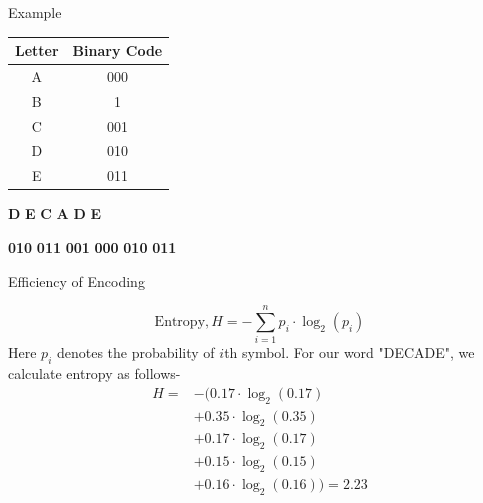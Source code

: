 \documentclass{beamer}
\begin{document}
	\begin{frame}{Example}
		
		\centering
		\begin{table}
			\begin{tabular}{c|c}
				\hline
				\onslide<1-> \textbf{Letter} & \textbf{Binary Code} \\
				\hline
				A & 000  \\
				B & 1  \\
				C & 001 \\
				D & 010 \\
				E & 011 
			\end{tabular}
		\end{table}
		\begin{center}
			\Large
			\textcolor{codecolorone}{\textbf{D}}
			\onslide<2->
			\textcolor{codecolortwo}{\textbf{E}}
			\onslide<3->
			\textcolor{codecolorone}{\textbf{C}}
			\onslide<4->
			\textcolor{codecolortwo}{\textbf{A}}
			\onslide<5->
			\textcolor{codecolorone}{\textbf{D}}
			\onslide<6->
			\textcolor{codecolortwo}{\textbf{E}}
		\end{center}
		
		\begin{center}
			\huge
			\textcolor{codecolorone}{\textbf{010}}
			\onslide<2->
			\textcolor{codecolortwo}{\textbf{011}}
			\onslide<3->
			\textcolor{codecolorone}{\textbf{001}}
			\onslide<4->
			\textcolor{codecolortwo}{\textbf{000}}
			\onslide<5->
			\textcolor{codecolorone}{\textbf{010}}
			\onslide<6->
			\textcolor{codecolortwo}{\textbf{011}}
		\end{center}
		
	\end{frame}
	
	\setbeamercovered{}
	\begin{frame}{Efficiency of Encoding}
		
		
		
		\[
		\text{Entropy}, H = - \sum_{i=1}^{n} p_i \cdot \log_2(p_i)
		\]
		Here $p_i$ denotes the probability of $i$th symbol. For our word "DECADE", we calculate entropy as follows-
		$$
		\begin{align*}
			H = & - (0.17 \cdot \log_2(0.17) \\
			& + 0.35 \cdot \log_2(0.35) \\
			& + 0.17 \cdot \log_2(0.17) \\
			& + 0.15 \cdot \log_2(0.15) \\
			& + 0.16 \cdot \log_2(0.16)) = 2.23 \\
		\end{align*}
		
		
	\end{frame}	
	
\end{document}
